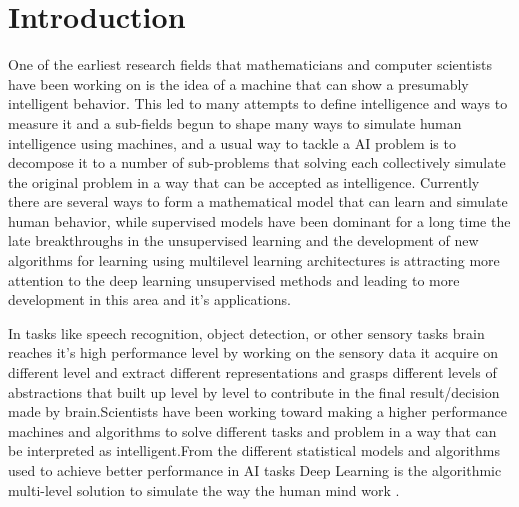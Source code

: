 \documentclass[12pt,twoside]{article}
\theoremstyle{plain}
\theoremstyle{definition}
\theoremstyle{remark}
\begin{document}
\setcounter{tocdepth}{2} 					%
\tableofcontents
{}
\clearpage



\section{Introduction}
\label{sec:introduction}
One of the earliest research fields that mathematicians and computer scientists have been working on is the idea of a machine that can show a presumably intelligent behavior. 
This led to many attempts to define intelligence and ways to measure it \cite{turing1950computing} and a sub-fields begun to shape many ways to simulate human intelligence using machines, and a usual way to tackle a AI problem is to decompose it to a number of sub-problems that solving each collectively simulate the original problem in a way that can be accepted as intelligence. Currently there are several ways to form a mathematical model that can learn and simulate human behavior,  while supervised models have been dominant for a long time the late breakthroughs in the unsupervised learning and the development of new algorithms \cite{HintonSalakhutdinov2006b} \cite{Bengio-2009} \cite{Lee2009} for learning using multilevel learning architectures is attracting more attention to the deep learning unsupervised methods and leading to more development in this area and it's applications.

In tasks like speech recognition, object detection, or other sensory tasks brain reaches it's high performance level by working on the sensory data it acquire on different level and extract different representations and grasps different levels of abstractions that built up level by level to contribute in the final result/decision made by brain.Scientists have been working toward making a higher performance machines and algorithms to solve different tasks and problem in a way that can be interpreted as intelligent.From the different statistical models and algorithms used to achieve better performance in AI tasks Deep Learning is the algorithmic multi-level solution to simulate the way the human mind work \cite{Hinton:2007}.
\end{document}
